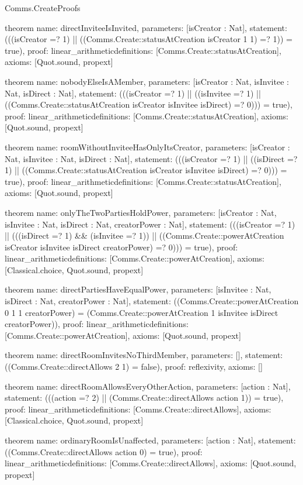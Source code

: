 \begin{lexlean}{Comms.CreateProofs}
\begin{semanticmodule}
theorem{
  name: directInviteeIsInvited,
  parameters: [isCreator : Nat],
  statement: (((isCreator =? 1) || ((Comms.Create::statusAtCreation isCreator 1 1) =? 1)) = true),
  proof: linear_arithmetic{definitions: [Comms.Create::statusAtCreation]},
  axioms: [Quot.sound, propext]
}

theorem{
  name: nobodyElseIsAMember,
  parameters: [isCreator : Nat, isInvitee : Nat, isDirect : Nat],
  statement: (((isCreator =? 1) || ((isInvitee =? 1) || ((Comms.Create::statusAtCreation isCreator isInvitee isDirect) =? 0))) = true),
  proof: linear_arithmetic{definitions: [Comms.Create::statusAtCreation]},
  axioms: [Quot.sound, propext]
}

theorem{
  name: roomWithoutInviteeHasOnlyItsCreator,
  parameters: [isCreator : Nat, isInvitee : Nat, isDirect : Nat],
  statement: (((isCreator =? 1) || ((isDirect =? 1) || ((Comms.Create::statusAtCreation isCreator isInvitee isDirect) =? 0))) = true),
  proof: linear_arithmetic{definitions: [Comms.Create::statusAtCreation]},
  axioms: [Quot.sound, propext]
}

theorem{
  name: onlyTheTwoPartiesHoldPower,
  parameters: [isCreator : Nat, isInvitee : Nat, isDirect : Nat, creatorPower : Nat],
  statement: (((isCreator =? 1) || (((isDirect =? 1) && (isInvitee =? 1)) || ((Comms.Create::powerAtCreation isCreator isInvitee isDirect creatorPower) =? 0))) = true),
  proof: linear_arithmetic{definitions: [Comms.Create::powerAtCreation]},
  axioms: [Classical.choice, Quot.sound, propext]
}

theorem{
  name: directPartiesHaveEqualPower,
  parameters: [isInvitee : Nat, isDirect : Nat, creatorPower : Nat],
  statement: ((Comms.Create::powerAtCreation 0 1 1 creatorPower) = (Comms.Create::powerAtCreation 1 isInvitee isDirect creatorPower)),
  proof: linear_arithmetic{definitions: [Comms.Create::powerAtCreation]},
  axioms: [Quot.sound, propext]
}

theorem{
  name: directRoomInvitesNoThirdMember,
  parameters: [],
  statement: ((Comms.Create::directAllows 2 1) = false),
  proof: reflexivity{},
  axioms: []
}

theorem{
  name: directRoomAllowsEveryOtherAction,
  parameters: [action : Nat],
  statement: (((action =? 2) || (Comms.Create::directAllows action 1)) = true),
  proof: linear_arithmetic{definitions: [Comms.Create::directAllows]},
  axioms: [Classical.choice, Quot.sound, propext]
}

theorem{
  name: ordinaryRoomIsUnaffected,
  parameters: [action : Nat],
  statement: ((Comms.Create::directAllows action 0) = true),
  proof: linear_arithmetic{definitions: [Comms.Create::directAllows]},
  axioms: [Quot.sound, propext]
}


\end{semanticmodule}
\end{lexlean}
